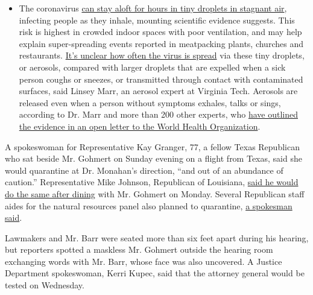 \begin{itemize}
  \begin{itemize}
  \tightlist
  \item
    The coronavirus
    \href{https://www.nytimes.com/2020/07/04/health/239-experts-with-one-big-claim-the-coronavirus-is-airborne.html?action=click\&pgtype=Article\&state=default\&region=MAIN_CONTENT_3\&context=storylines_faq}{can
    stay aloft for hours in tiny droplets in stagnant air}, infecting
    people as they inhale, mounting scientific evidence suggests. This
    risk is highest in crowded indoor spaces with poor ventilation, and
    may help explain super-spreading events reported in meatpacking
    plants, churches and restaurants.
    \href{https://www.nytimes.com/2020/07/06/health/coronavirus-airborne-aerosols.html?action=click\&pgtype=Article\&state=default\&region=MAIN_CONTENT_3\&context=storylines_faq}{It's
    unclear how often the virus is spread} via these tiny droplets, or
    aerosols, compared with larger droplets that are expelled when a
    sick person coughs or sneezes, or transmitted through contact with
    contaminated surfaces, said Linsey Marr, an aerosol expert at
    Virginia Tech. Aerosols are released even when a person without
    symptoms exhales, talks or sings, according to Dr. Marr and more
    than 200 other experts, who
    \href{https://academic.oup.com/cid/article/doi/10.1093/cid/ciaa939/5867798}{have
    outlined the evidence in an open letter to the World Health
    Organization}.
  \end{itemize}
\end{itemize}

A spokeswoman for Representative Kay Granger, 77, a fellow Texas
Republican who sat beside Mr. Gohmert on Sunday evening on a flight from
Texas, said she would quarantine at Dr. Monahan's direction, ``and out
of an abundance of caution.'' Representative Mike Johnson, Republican of
Louisiana,
\href{https://twitter.com/RepMikeJohnson/status/1288655872953024512?s=20}{said
he would do the same after dining} with Mr. Gohmert on Monday. Several
Republican staff aides for the natural resources panel also planned to
quarantine,
\href{https://twitter.com/CapitolHacker/status/1288590480121487360?s=20}{a
spokesman said}.

Lawmakers and Mr. Barr were seated more than six feet apart during his
hearing, but reporters spotted a maskless Mr. Gohmert outside the
hearing room exchanging words with Mr. Barr, whose face was also
uncovered. A Justice Department spokeswoman, Kerri Kupec, said that the
attorney general would be tested on Wednesday.

